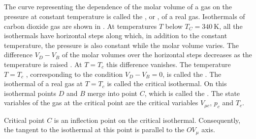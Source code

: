 \subsection{}\label{12.3.1} The curve representing the dependence of the molar volume of a gas on the pressure at constant temperature is called the , or , of a real gas. Isothermals of carbon dioxide gas are shown in . At temperatures $T$ below $T_{C} = \SI{340}{\kelvin}$, all the isothermals have horizontal steps along which, in addition to the constant temperature, the pressure is also constant while the molar volume varies. The difference $V_{D} - V_{B}$ of the molar volumes over the horizontal steps de­creases as the temperature is raised . At $T = T_{c}$ this difference vanishes. The temperature $T = T_{c}$ , corresponding to the condition $V_{D} - V_{B} = 0$, is called the . The isothermal of a real gas at $T = T_{c}$ is called the critical isothermal. On this isothermal points $D$ and $B$ merge into point $C$, which is called the . The state variables  of the gas at the critical point are the critical variables $V_{\mu c}$, $p_{c}$ and $T_{c}$.



Critical point $C$ is an inflection point on the critical isothermal.
Consequently, the tangent to the isothermal at this point is parallel to the $OV_{\mu}$ axis.

